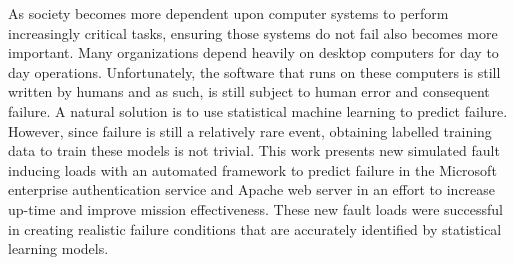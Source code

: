 As society becomes more dependent upon computer systems to perform increasingly
critical tasks, ensuring those systems do not fail also becomes more important.
Many organizations depend heavily on desktop computers for day to day
operations. Unfortunately, the software that runs on these computers is still
written by humans and as such, is still subject to human error and consequent
failure. A natural solution is to use statistical machine learning to predict
failure. However, since failure is still a relatively rare event, obtaining
labelled training data to train these models is not trivial. This work presents
new simulated fault inducing loads with an automated framework to predict
failure in the Microsoft enterprise authentication service and Apache web
server in an effort to increase up-time and improve mission effectiveness.
These new fault loads were successful in creating realistic failure conditions
that are accurately identified by statistical learning models.
